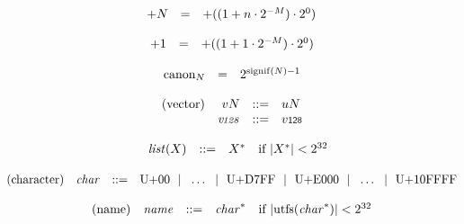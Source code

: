 $$
\begin{array}[t]{@{}lcl@{}l@{}}
{+N} & = & {+((1 + n \cdot {2^{{-M}}}) \cdot {2^{0}})} \\
\end{array}
$$

$$
\begin{array}[t]{@{}lcl@{}l@{}}
{+1} & = & {+((1 + 1 \cdot {2^{{-M}}}) \cdot {2^{0}})} \\
\end{array}
$$

$$
\begin{array}[t]{@{}lcl@{}l@{}}
{{\mathrm{canon}}}_{N} & = & {2^{{\mathrm{signif}}(N) - 1}} \\
\end{array}
$$

\vspace{1ex}

$$
\begin{array}[t]{@{}lrrl@{}l@{}}
\mbox{(vector)} & {v}{N} & ::= & {u}{N} \\
& {\mathit{v{\kern-0.1em\scriptstyle 128}}} & ::= & {v}{\mathsf{{\scriptstyle 128}}} \\
\end{array}
$$

\vspace{1ex}

$$
\begin{array}[t]{@{}lrrl@{}l@{}}
& {\mathit{list}}(X) & ::= & {X^\ast} & \quad \mbox{if}~ {|{X^\ast}|} < {2^{32}} \\
\end{array}
$$

\vspace{1ex}

$$
\begin{array}[t]{@{}lrrl@{}l@{}}
\mbox{(character)} & {\mathit{char}} & ::= & \mathrm{U{+}00} ~~|~~ \ldots ~~|~~ \mathrm{U{+}D7FF} ~~|~~ \mathrm{U{+}E000} ~~|~~ \ldots ~~|~~ \mathrm{U{+}10FFFF} \\
\end{array}
$$

$$
\begin{array}[t]{@{}lrrl@{}l@{}}
\mbox{(name)} & {\mathit{name}} & ::= & {{\mathit{char}}^\ast} & \quad \mbox{if}~ {|{\mathrm{utf{\kern-0.1em\scriptstyle 8}}}({{\mathit{char}}^\ast})|} < {2^{32}} \\
\end{array}
$$

\vspace{1ex}

